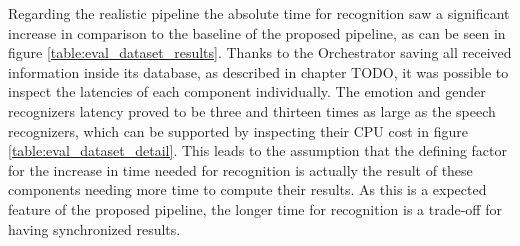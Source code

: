 { %
Regarding the realistic pipeline the absolute time for recognition saw a significant increase in comparison to the baseline of the proposed pipeline, as can be seen in figure \ref{table:eval_dataset_results}.
Thanks to the Orchestrator saving all received information inside its database, as described in chapter TODO, it was possible to inspect the latencies of each component individually.
The emotion and gender recognizers latency proved to be three and thirteen times as large as the speech recognizers, which can be supported by inspecting their CPU cost in figure \ref{table:eval_dataset_detail}.
This leads to the assumption that the defining factor for the increase in time needed for recognition is actually the result of these components needing more time to compute their results.
As this is a expected feature of the proposed pipeline, the longer time for recognition is a trade-off for having synchronized results.
}

